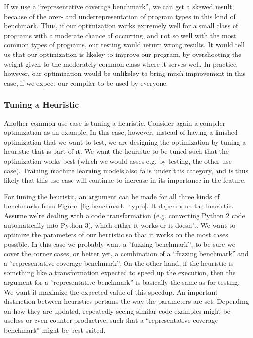 If we use a ``representative coverage benchmark'', we can get a skewed result, because of the over- and underrepresentation of program types in this kind of benchmark.
Thus, if our optimization works extremely well for a small class of programs with a moderate chance of occurring, and not so well with the most common types of programs, our testing would return wrong results.
It would tell us that our optimization is likeley to improve our program, by overshooting the weight given to the moderately common class where it serves well.
In practice, however, our optimization would be unlikeley to bring much improvement in this case, if we expect our compiler to be used by everyone.

\subsubsection{Tuning a Heuristic}
\label{sec:tuning}

Another common use case is tuning a heuristic. Consider again a compiler optimization as an example. In this case, however, instead of having a finished optimization that we want to test, we are designing the optimization by tuning a heuristic that is part of it.
We want the heuristic to be tuned such that the optimization works best (which we would asses e.g. by testing, the other use-case).
Training machine learning models also falls under this category, and is thus likely that this use case will continue to increase in its importance in the feature.

For tuning the heuristic, an argument can be made for all three kinds of benchmarks from Figure~\ref{fig:benchmark_types}. It depends on the heuristic.
Assume we're dealing with a code transformation (e.g. converting Python 2 code automatically into Python 3),  which either it works or it doesn't. We want to optimize the parameters of our heuristic so that it works on the most cases possible.
In this case we probably want a ``fuzzing benchmark'', to be sure we cover the corner cases, or better yet, a combination of a ``fuzzing benchmark'' and a ``representative coverage benchmark''.
On the other hand, if the heuristic is something like a transformation expected to speed up the execution, then the argument for a ``representative benchmark'' is basically the same as for testing.
We want it maximize the expected value of this speedup.
An important distinction between heuristics pertains the way the parameters are set. Depending on how they are updated, repeatedly seeing similar code examples might be useless or even counter-productive, such that a ``representative coverage benchmark'' might be best suited.

